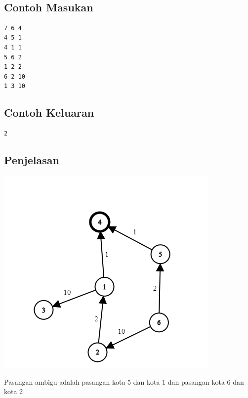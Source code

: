 \documentclass{article}
\begin{document}
\\

\begin{multicols}{2}
\subsection*{Contoh Masukan}
\begin{lstlisting}
7 6 4
4 5 1
4 1 1
5 6 2
1 2 2
6 2 10
1 3 10

\end{lstlisting}
\columnbreak
\subsection*{Contoh Keluaran}
\begin{lstlisting}
2 
\end{lstlisting}
\vfill
\null
\end{multicols}


\pagebreak
\subsection*{Penjelasan}
\begin{center}
    \includegraphics{graph.png}
\end{center}
Pasangan ambigu adalah pasangan kota 5 dan kota 1 dan pasangan kota 6 dan kota 2


\pagebreak
\end{document}
